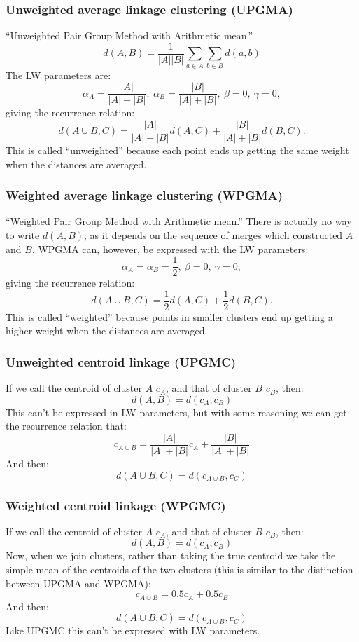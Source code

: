 \documentclass[12pt,a4paper]{article}
\newcommand{\1}[1]{\mathds{1}\left[#1\right]}
\begin{document}
\subsubsection{Unweighted average linkage clustering (UPGMA)}
\noindent ``Unweighted Pair Group Method with Arithmetic mean.''
\[d(A,B)=\frac{1}{|A||B|}\sum_{a\in A}\sum_{b\in B}d(a,b)\]
The LW parameters are:
\[\alpha_A=\frac{|A|}{|A|+|B|},\ \alpha_B=\frac{|B|}{|A|+|B|},\ \beta=0,\ \gamma=0,\]
giving the recurrence relation:
\[d(A\cup B,C)=\frac{|A|}{|A|+|B|}d(A,C)+\frac{|B|}{|A|+|B|}d(B,C).\]
This is called ``unweighted'' because each point ends up getting the same weight when the distances are averaged.

\subsubsection{Weighted average linkage clustering (WPGMA)}
``Weighted Pair Group Method with Arithmetic mean.'' There is actually no way to write $d(A,B)$, as it depends on the sequence of merges which constructed $A$ and $B$. WPGMA can, however, be expressed with the LW parameters:
\[\alpha_A=\alpha_B=\frac{1}{2},\ \beta=0,\ \gamma=0,\]
giving the recurrence relation:
\[d(A\cup B,C)=\frac{1}{2}d(A,C)+\frac{1}{2}d(B,C).\]
This is called ``weighted'' because points in smaller clusters end up getting a higher weight when the distances are averaged.
\subsubsection{Unweighted centroid linkage (UPGMC)}
If we call the centroid of cluster $A$ $c_A$, and that of cluster $B$ $c_B$, then:
\[d(A,B)=d(c_A,c_B)\]
This can't be expressed in LW parameters, but with some reasoning we can get the recurrence relation that:
\[c_{A\cup B}=\frac{|A|}{|A|+|B|}c_A+\frac{|B|}{|A|+|B|}\]
And then:
\[d(A\cup B, C)=d(c_{A\cup B},c_C)\]
\subsubsection{Weighted centroid linkage (WPGMC)}
If we call the centroid of cluster $A$ $c_A$, and that of cluster $B$ $c_B$, then:
\[d(A,B)=d(c_A,c_B)\]
Now, when we join clusters, rather than taking the true centroid we take the simple mean of the centroids of the two clusters (this is similar to the distinction between UPGMA and WPGMA):
\[c_{A\cup B}=0.5c_A+0.5c_B\]
And then:
\[d(A\cup B, C)=d(c_{A\cup B},c_C)\]
Like UPGMC this can't be expressed with LW parameters.
\end{document}
